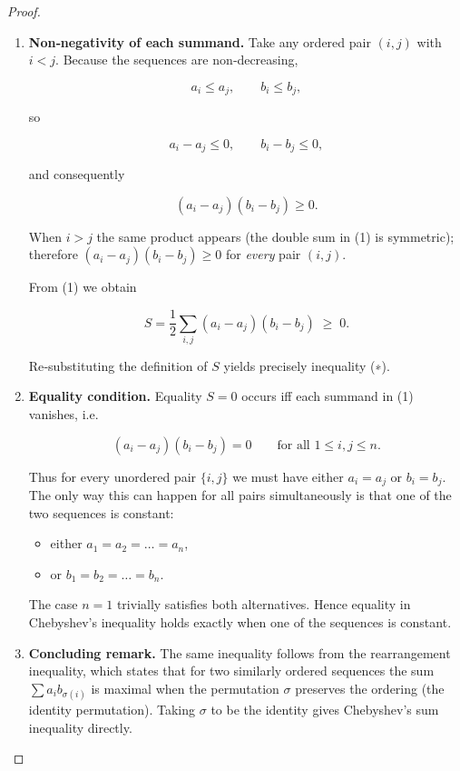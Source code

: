 \begin{proof}
\begin{enumerate}
Equation (1) is the desired double‑sum representation of \(S\).

\item \textbf{Non‑negativity of each summand.}  
Take any ordered pair \((i,j)\) with \(i<j\).  
Because the sequences are non‑decreasing,  

\[
a_i\le a_j,\qquad b_i\le b_j,
\]

so  

\[
a_i-a_j\le0,\qquad b_i-b_j\le0,
\]

and consequently  

\[
(a_i-a_j)(b_i-b_j)\ge0 .
\]

When \(i>j\) the same product appears (the double sum in (1) is symmetric);
therefore \((a_i-a_j)(b_i-b_j)\ge0\) for \emph{every} pair \((i,j)\).

From (1) we obtain  

\[
S=\frac12\sum_{i,j}(a_i-a_j)(b_i-b_j)\;\ge\;0 .
\]

Re‑substituting the definition of \(S\) yields precisely inequality (∗).

\item \textbf{Equality condition.}  
Equality \(S=0\) occurs iff each summand in (1) vanishes, i.e.  

\[
(a_i-a_j)(b_i-b_j)=0\qquad\text{for all }1\le i,j\le n .
\]

Thus for every unordered pair \(\{i,j\}\) we must have either \(a_i=a_j\) or
\(b_i=b_j\).  The only way this can happen for all pairs simultaneously is
that one of the two sequences is constant:

\begin{itemize}
\item either \(a_1=a_2=\dots =a_n\),
\item or \(b_1=b_2=\dots =b_n\).
\end{itemize}

The case \(n=1\) trivially satisfies both alternatives.  Hence equality in
Chebyshev’s inequality holds exactly when one of the sequences is constant.

\item \textbf{Concluding remark.}  
The same inequality follows from the rearrangement inequality, which states
that for two similarly ordered sequences the sum \(\sum a_i b_{\sigma(i)}\) is
maximal when the permutation \(\sigma\) preserves the ordering (the identity
permutation).  Taking \(\sigma\) to be the identity gives Chebyshev’s sum
inequality directly.

\end{enumerate}
\end{proof}